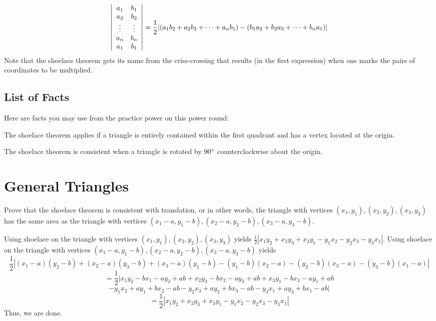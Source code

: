 \documentclass[11pt]{article}
\begin{document}
\begin{definition}
\[\left|\begin{array}{c c}a_1  & b_1 \\ a_2 &  b_2 \\ \vdots & \vdots \\ a_n & b_n \\ a_1 & b_1 \\ \end{array}\right| = \dfrac{1}{2} |(a_1b_2 + a_2b_3 + \cdots + a_nb_1) - (b_1a_2 + b_2a_3 + \cdots + b_na_1)|\]
Note that the shoelace theorem gets its name from the criss-crossing that results (in the first expression) when one marks the pairs of coordinates to be multiplied.
\end{definition}

\subsection{List of Facts}
Here are facts you may use from the practice power on this power round:

\begin{theorem}
The shoelace theorem applies if a triangle is entirely contained within the first quadrant and has a vertex located at the origin.
\end{theorem}

\begin{theorem}
The shoelace theorem is consistent when a triangle is rotated by $90\degree$ counterclockwise about the origin. 
\end{theorem}

\section{General Triangles}

\begin{problem}  Prove that the shoelace theorem is consistent with translation, or in other words, the triangle with vertices $(x_1, y_1), (x_2, y_2), (x_3, y_3)$ has the same area as the triangle with vertices $(x_1 - a, y_1 - b), (x_2 - a, y_2 - b ), (x_3 - a, y_3 - b)$. \end{problem}

\begin{solution}
Using shoelace on the triangle with vertices $(x_1, y_1), (x_2, y_2), (x_3, y_3)$ yields $\frac{1}{2}|x_1y_2+x_2y_3+x_3y_1-y_1x_2-y_2x_3-y_3x_1|$. Using shoelace on the triangle with vertices $(x_1 - a, y_1 - b), (x_2 - a, y_2 - b ), (x_3 - a, y_3 - b)$ yields \[\frac{1}{2}|(x_1-a)(y_2-b)+(x_2-a)(y_3-b)+(x_3-a)(y_1-b)-(y_1-b)(x_2-a)-(y_2-b)(x_3-a)-(y_3-b)(x_1-a)|\]
\[=\frac{1}{2}|x_1y_2-bx_1-ay_2+ab+x_2y_3-bx_2-ay_3+ab+x_3y_1-bx_3-ay_1+ab \]
\[-y_1x_2+ay_1+bx_2-ab-y_2x_3+ay_2+bx_3-ab-y_3x_1+ay_3+bx_1-ab|\]
\[=\frac{1}{2}|x_1y_2+x_2y_3+x_3y_1-y_1x_2-y_2x_3-y_3x_1|\]
Thus, we are done.
\end{solution}
\end{document}
